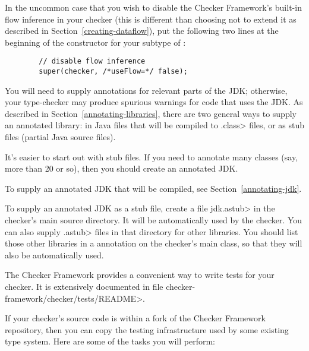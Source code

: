
In the uncommon case that you wish to disable the Checker Framework's
built-in flow inference in your checker (this is different than choosing
not to extend it as described in Section~\ref{creating-dataflow}), put the
following two lines at the beginning of the constructor for your subtype of
:

\begin{Verbatim}
        // disable flow inference
        super(checker, /*useFlow=*/ false);
\end{Verbatim}



You will need to supply annotations for relevant parts of the JDK;
otherwise, your type-checker may produce spurious warnings for code that
uses the JDK.  As described in Section~\ref{annotating-libraries},
there are two general ways to supply an annotated library:  in Java files
that will be compiled to \<.class> files, or as stub files (partial Java source files).

It's easier to start out with stub files.  If you need to annotate many
classes (say, more than 20 or so), then you should create an annotated JDK.

To supply an annotated JDK that will be compiled, see Section~\ref{annotating-jdk}.

To supply an annotated JDK as a stub file, create a file \<jdk.astub> in
the checker's main source directory.  It will be automatically used by the
checker.
You can also supply \<.astub> files in that directory for other libraries.
You should list those other libraries in a
 annotation on the checker's main
class, so that they will also be automatically used.



\begin{sloppypar}
The Checker Framework provides a convenient way to write tests for your
checker.
It is extensively documented in file \<checker-framework/checker/tests/README>.
\end{sloppypar}

If your checker's source code is within a fork of the Checker Framework
repository, then you can copy the testing infrastructure used by some
existing type system.  Here are some of the tasks you will perform:


